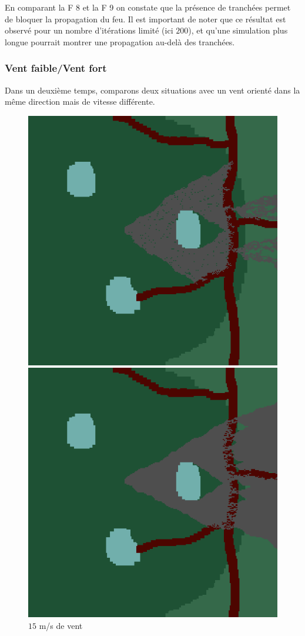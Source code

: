 \documentclass[12pt]{article}
\newcommand{\fig}[1]{
    F\resizebox{!}{1.3ex}{IGURE} #1
}
\begin{document}
En comparant la\fig{8}et la\fig{9}on constate que la présence de tranchées permet de bloquer la propagation du feu. Il est important de noter que ce résultat est observé pour un nombre d'itérations limité (ici $200$), et qu'une simulation plus longue pourrait montrer une propagation au-delà des tranchées.

\subsubsection{Vent faible/Vent fort}

Dans un deuxième temps, comparons deux situations avec un vent orienté dans la même direction mais de vitesse différente.

\begin{figure}[!ht]
    \centering
    \begin{minipage}{0.35\textwidth}
      \centering
      \includegraphics[width=.8\linewidth]{pictures/trans/treach_15.png}
      \caption{$15$ m/s de vent}\label{Fig:Data7}
    \end{minipage}\hfil
    \begin{minipage}{0.35\textwidth}
      \centering
      \includegraphics[width=.8\linewidth]{pictures/trans/treach_30.png}

\end{minipage}
\end{figure}
\end{document}
